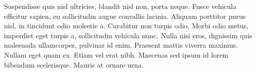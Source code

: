 \documentclass[12pt, a4paper]{article}
\begin{document}
Suspendisse quis nisl ultricies, blandit nisl non, porta neque. Fusce vehicula efficitur sapien, eu sollicitudin augue convallis lacinia. Aliquam porttitor purus nisl, in tincidunt odio molestie a. Curabitur non turpis odio. Morbi odio metus, imperdiet eget turpis a, sollicitudin vehicula nunc. Nulla nisi eros, dignissim quis malesuada ullamcorper, pulvinar id enim. Praesent mattis viverra maximus. Nullam eget quam ex. Etiam vel erat nibh. Maecenas sed ipsum id lorem bibendum scelerisque. Mauris at ornare urna.
\end{document}
